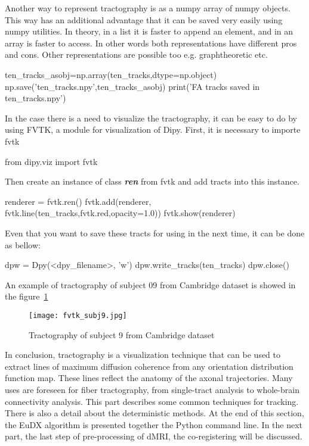 Another way to represent tractography is as a numpy array of numpy objects. This way has an additional advantage that it can be saved very easily using numpy utilities. In theory, in a list it is faster to append an element, and in an array is faster to access. In other words both representations have different pros and cons. Other representations are possible too e.g. graphtheoretic etc.

\begin{python}
ten_tracks_asobj=np.array(ten_tracks,dtype=np.object)
np.save('ten_tracks.npy',ten_tracks_asobj)
print('FA tracks saved in ten_tracks.npy')
\end{python}

In the case there is a need to visualize the tractography, it can be easy to do by using FVTK, a module for visualization of Dipy. First, it is necessary to importe fvtk

\begin{python}
from dipy.viz import fvtk
\end{python}

Then create an instance of class \textbf{\textit{ren}} from fvtk and add tracts into this instance.

\begin{python}
renderer = fvtk.ren()
fvtk.add(renderer, fvtk.line(ten_tracks,fvtk.red,opacity=1.0))
fvtk.show(renderer)
\end{python}

Even that you want to save these tracts for using in the next time, it can be done as bellow:

\begin{python}
dpw = Dpy(<dpy_filename>, 'w')
dpw.write_tracks(ten_tracks)
dpw.close()
\end{python}
An example of tractography of subject 09 from Cambridge dataset is showed in the figure~\ref{Fig:fvtk_subj9}
\begin{figure} 
  \centering 
  \texttt{[image: fvtk\_subj9.jpg]}
  \caption{Tractography of subject 9 from Cambridge dataset}
  \label{Fig:fvtk_subj9}
\end{figure}


In conclusion, tractography is a visualization technique that can be used to extract lines of maximum diffusion coherence from any orientation distribution function map. These lines reflect the anatomy of the axonal trajectories. Many uses are foreseen for fiber tractography, from single-tract analysis to whole-brain connectivity analysis. This part describes some common techniques for tracking. There is also a detail about the deterministic methods. At the end of this section, the EuDX algorithm is presented together the Python command line. In the next part, the last step of pre-processing of dMRI, the co-registering will be discussed.

